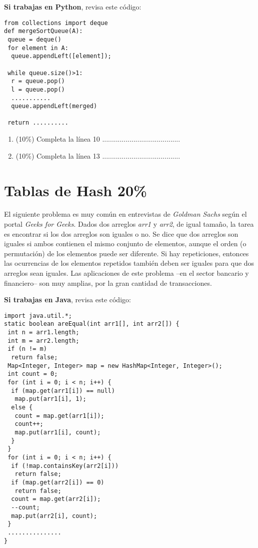 \documentclass[10 pt]{article}
\begin{document}
\begin{multicols}{2}
\textbf{Si trabajas en Python}, revisa este código:

{\footnotesize
\begin{lstlisting}
from collections import deque
def mergeSortQueue(A):
 queue = deque()
 for element in A:
  queue.appendLeft([element]);
 
 while queue.size()>1:
  r = queue.pop()
  l = queue.pop()
  ...........
  queue.appendLeft(merged)  
 
 return ..........

\end{lstlisting}
}

\begin{enumerate}[label=\Alph*]
	\item (10\%) Completa la línea 10 ........................................
	\item (10\%) Completa la línea 13 ........................................
\end{enumerate}


\section{Tablas de Hash 20\%}
El siguiente problema es muy común en entrevistas de \textit{Goldman Sachs} según el portal \textit{Geeks for Geeks}. 
Dados dos arreglos \textit{arr1} y \textit{arr2}, de igual tamaño, la tarea es encontrar si los dos arreglos son iguales o no. Se dice que dos arreglos son iguales si ambos contienen el mismo conjunto de elementos, aunque el orden (o permutación) de los elementos puede ser diferente. 
Si hay repeticiones, entonces las ocurrencias de los elementos repetidos también deben ser iguales para que dos arreglos sean iguales. Las aplicaciones de este problema --en el sector bancario y financiero-- son muy amplias, por la gran cantidad de transacciones. 

\textbf{Si trabajas en Java}, revisa este código:

{\footnotesize
\begin{lstlisting}
import java.util.*;  
static boolean areEqual(int arr1[], int arr2[]) { 
 int n = arr1.length; 
 int m = arr2.length; 
 if (n != m) 
  return false; 
 Map<Integer, Integer> map = new HashMap<Integer, Integer>(); 
 int count = 0;  
 for (int i = 0; i < n; i++) { 
  if (map.get(arr1[i]) == null) 
   map.put(arr1[i], 1); 
  else { 
   count = map.get(arr1[i]); 
   count++; 
   map.put(arr1[i], count); 
  } 
 } 
 for (int i = 0; i < n; i++) { 
  if (!map.containsKey(arr2[i])) 
   return false; 
  if (map.get(arr2[i]) == 0) 
   return false; 
  count = map.get(arr2[i]); 
  --count; 
  map.put(arr2[i], count); 
 } 
 ...............
} 
\end{lstlisting}
}


\end{multicols}
\end{document}
